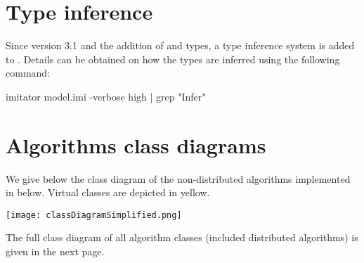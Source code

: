 



\chapter{Type inference}

Since version 3.1 and the addition of  and  types, a type inference system is added to \imitator{}.
Details can be obtained on how the types are inferred using the following command:

\begin{terminal}
imitator model.imi -verbose high | grep "Infer"
\end{terminal}


\chapter{Algorithms class diagrams}

We give below the class diagram of the non-distributed algorithms implemented in \imitator{} below.
Virtual classes are depicted in yellow.


\texttt{[image: classDiagramSimplified.png]}



The full class diagram of all algorithm classes (included distributed algorithms) is given in the next page.

\newenvironment{changemargin}[2]{%
\begin{list}{}{%
\setlength{\topsep}{0pt}%
\setlength{\leftmargin}{#1}%
\setlength{\rightmargin}{#2}%
\setlength{\listparindent}{\parindent}%
\setlength{\itemindent}{\parindent}%
\setlength{\parsep}{\parskip}%
}%
\item[]}{\end{list}}

